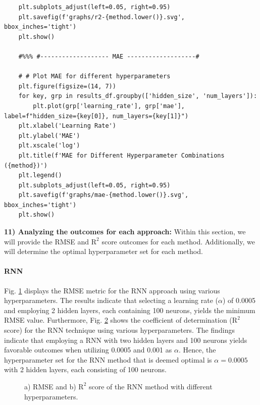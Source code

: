 \documentclass[journal,onecolumn]{IEEEtran}
\begin{document}
{\begin{appendices}
\begin{verbatim}
    plt.subplots_adjust(left=0.05, right=0.95)
    plt.savefig(f'graphs/r2-{method.lower()}.svg', bbox_inches='tight')
    plt.show()

    #%%% #------------------- MAE -------------------#

    # # Plot MAE for different hyperparameters
    plt.figure(figsize=(14, 7))
    for key, grp in results_df.groupby(['hidden_size', 'num_layers']):
        plt.plot(grp['learning_rate'], grp['mae'], label=f"hidden_size={key[0]}, num_layers={key[1]}")
    plt.xlabel('Learning Rate')
    plt.ylabel('MAE')
    plt.xscale('log')
    plt.title(f'MAE for Different Hyperparameter Combinations ({method})')
    plt.legend()
    plt.subplots_adjust(left=0.05, right=0.95)
    plt.savefig(f'graphs/mae-{method.lower()}.svg', bbox_inches='tight')
    plt.show()
\end{verbatim}

\textbf{11) Analyzing the outcomes for each approach: } Within this section, we will provide the RMSE and $\text{R}^2$ score outcomes for each method. Additionally, we will determine the optimal hyperparameter set for each method.


\paragraph{RNN}
Fig. \ref{fig:rmse-rnn} displays the RMSE metric for the RNN approach using various hyperparameters. The results indicate that selecting a learning rate ($\alpha$) of 0.0005 and employing 2 hidden layers, each containing 100 neurons, yields the minimum RMSE value. Furthermore, Fig. \ref{fig:r2-rnn} shows the coefficient of determination ($\text{R}^2$ score) for the RNN technique using various hyperparameters. The findings indicate that employing a RNN with two hidden layers and 100 neurons yields favorable outcomes when utilizing 0.0005 and 0.001 as $\alpha$. Hence, the hyperparameter set for the RNN method that is deemed optimal is $\alpha=0.0005$ with 2 hidden layers, each consisting of 100 neurons.

\begin{figure}[htbp]
    \centering
    \begin{subfigure}[b]{0.5\linewidth}
        \centering
        
        \caption{}
        \label{fig:rmse-rnn}
    \end{subfigure}%
    \begin{subfigure}[b]{0.5\linewidth}
        \centering
        
        \caption{}
        \label{fig:r2-rnn}
    \end{subfigure}
    \caption{a) RMSE and b) $\text{R}^2$ score of the RNN method with different hyperparameters.}
    \label{fig:rnn-hypers}
\end{figure}


\end{appendices}}
\end{document}
